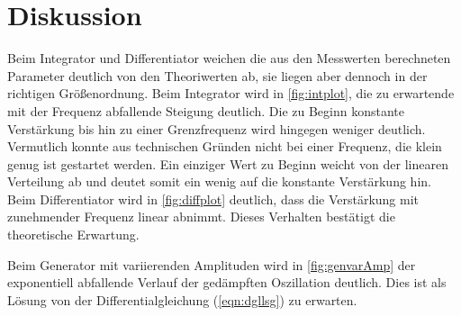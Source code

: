 \section{Diskussion}
\label{sec:Diskussion}


Beim Integrator und Differentiator weichen die aus den Messwerten berechneten Parameter deutlich von den Theoriwerten ab, sie liegen aber dennoch 
in der richtigen Größenordnung. Beim Integrator wird in \autoref{fig:intplot}, die zu erwartende mit der Frequenz abfallende Steigung deutlich. 
Die zu Beginn konstante Verstärkung bis hin zu einer Grenzfrequenz wird hingegen weniger deutlich. Vermutlich konnte aus technischen Gründen nicht 
bei einer Frequenz, die klein genug ist gestartet werden. Ein einziger Wert zu Beginn weicht von der linearen Verteilung ab und deutet somit ein 
wenig auf die konstante Verstärkung hin. Beim Differentiator wird in \autoref{fig:diffplot} deutlich, dass die Verstärkung mit zunehmender Frequenz linear 
abnimmt. Dieses Verhalten bestätigt die theoretische Erwartung.


Beim Generator mit variierenden Amplituden wird in \autoref{fig:genvarAmp} der exponentiell abfallende Verlauf der gedämpften Oszillation 
deutlich. Dies ist als Lösung von der Differentialgleichung (\autoref{eqn:dgllsg}) zu erwarten.